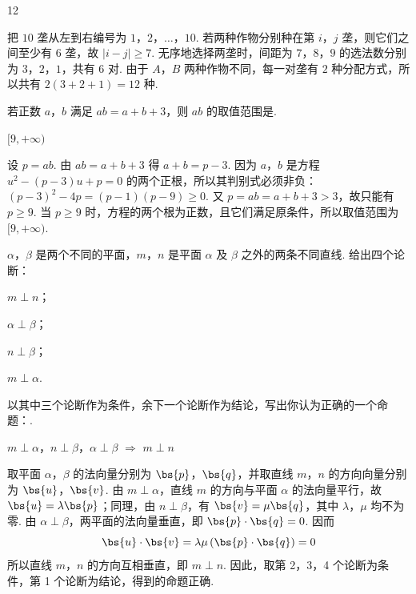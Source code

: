 \begin{answer}
12
\end{answer}

\begin{solution}
把 \(10\) 垄从左到右编号为 \(1\)，\(2\)，\(\ldots\)，\(10\). 若两种作物分别种在第 \(i\)，\(j\) 垄，则它们之间至少有 \(6\) 垄，故 \(|i-j|\geqslant7\).
无序地选择两垄时，间距为 \(7\)，\(8\)，\(9\) 的选法数分别为 \(3\)，\(2\)，\(1\)，共有 \(6\) 对. 由于 \(A\)，\(B\) 两种作物不同，每一对垄有 \(2\) 种分配方式，所以共有 \(2(3+2+1)=12\) 种.
\end{solution}

\begin{problem}
若正数 \(a\)，\(b\) 满足 \(ab = a + b + 3\)，则 \(ab\) 的取值范围是\fillinblank{}.
\end{problem}

\begin{answer}
\([9,+\infty)\)
\end{answer}

\begin{solution}
设 \(p=ab\). 由 \(ab=a+b+3\) 得 \(a+b=p-3\). 因为 \(a\)，\(b\) 是方程
\(u^2-(p-3)u+p=0\) 的两个正根，所以其判别式必须非负：
\((p-3)^2-4p=(p-1)(p-9)\geqslant0\).
又 \(p=ab=a+b+3>3\)，故只能有 \(p\geqslant9\).
当 \(p\geqslant9\) 时，方程的两个根为正数，且它们满足原条件，所以取值范围为 \([9,+\infty)\).
\end{solution}

\begin{problem}
\(\alpha\)，\(\beta\) 是两个不同的平面，\(m\)，\(n\) 是平面 \(\alpha\) 及 \(\beta\) 之外的两条不同直线. 给出四个论断：

\begin{circlelist}
\item \(m\perp n\)；
\item \(\alpha\perp\beta\)；
\item \(n\perp\beta\)；
\item \(m\perp\alpha\).
\end{circlelist}

以其中三个论断作为条件，余下一个论断作为结论，写出你认为正确的一个命题：\fillinblank{}.
\end{problem}

\begin{answer}
\(m\perp\alpha\)，\(n\perp\beta\)，\(\alpha\perp\beta\) \(\Longrightarrow\) \(m\perp n\)
\end{answer}

\begin{solution}
取平面 \(\alpha\)，\(\beta\) 的法向量分别为 \(\bs{p}\)，\(\bs{q}\)，并取直线 \(m\)，\(n\) 的方向向量分别为 \(\bs{u}\)，\(\bs{v}\). 由 \(m\perp\alpha\)，直线 \(m\) 的方向与平面 \(\alpha\) 的法向量平行，故 \(\bs{u}=\lambda\bs{p}\)；同理，由 \(n\perp\beta\)，有 \(\bs{v}=\mu\bs{q}\)，其中 \(\lambda\)，\(\mu\) 均不为零. 由 \(\alpha\perp\beta\)，两平面的法向量垂直，即 \(\bs{p}\cdot\bs{q}=0\). 因而
\[
\bs{u}\cdot\bs{v}=\lambda\mu\left(\bs{p}\cdot\bs{q}\right)=0
\]
所以直线 \(m\)，\(n\) 的方向互相垂直，即 \(m\perp n\). 因此，取第 2，3，4 个论断为条件，第 1 个论断为结论，得到的命题正确.
\end{solution}

